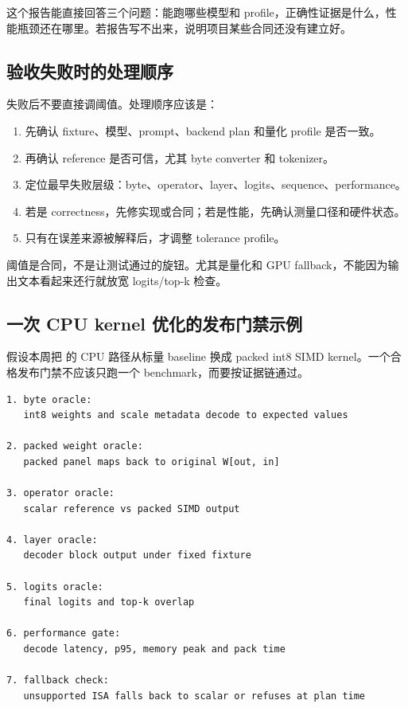 这个报告能直接回答三个问题：能跑哪些模型和 profile，正确性证据是什么，性能瓶颈还在哪里。若报告写不出来，说明项目某些合同还没有建立好。

\subsection{验收失败时的处理顺序}

失败后不要直接调阈值。处理顺序应该是：

\begin{enumerate}
  \item 先确认 fixture、模型、prompt、backend plan 和量化 profile 是否一致。
  \item 再确认 reference 是否可信，尤其 byte converter 和 tokenizer。
  \item 定位最早失败层级：byte、operator、layer、logits、sequence、performance。
  \item 若是 correctness，先修实现或合同；若是性能，先确认测量口径和硬件状态。
  \item 只有在误差来源被解释后，才调整 tolerance profile。
\end{enumerate}

阈值是合同，不是让测试通过的旋钮。尤其是量化和 GPU fallback，不能因为输出文本看起来还行就放宽 logits/top-k 检查。

\subsection{一次 CPU kernel 优化的发布门禁示例}

假设本周把  的 CPU 路径从标量 baseline 换成 packed int8 SIMD kernel。一个合格发布门禁不应该只跑一个 benchmark，而要按证据链通过。

\begin{lstlisting}[numbers=none,caption={CPU int8 kernel 发布门禁}]
1. byte oracle:
   int8 weights and scale metadata decode to expected values

2. packed weight oracle:
   packed panel maps back to original W[out, in]

3. operator oracle:
   scalar reference vs packed SIMD output

4. layer oracle:
   decoder block output under fixed fixture

5. logits oracle:
   final logits and top-k overlap

6. performance gate:
   decode latency, p95, memory peak and pack time

7. fallback check:
   unsupported ISA falls back to scalar or refuses at plan time
\end{lstlisting}


